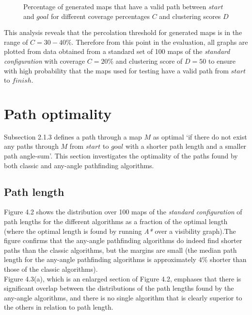 \documentclass[12pt,notitlepage]{report}
\begin{document}
\begin{figure}
\centering

\caption[Percentage of generated maps that have a valid path between $start$ and $goal$]{Percentage of generated maps that have a valid path between $start$ and $goal$ for different coverage percentages $C$ and clustering scores $D$}
\end{figure}

\noindent
This analysis reveals that the percolation threshold for generated maps is in the range of $C=30-40\%$. Therefore from this point in the evaluation, all graphs are plotted from data obtained from a standard set of 100 maps of the {\em standard configuration} with coverage $C=20\%$ and clustering score of $D=50$ to ensure with high probability that the maps used for testing have a valid path from $start$ to $finish$.

\section{Path optimality}

Subsection 2.1.3 defines a path through a map $M$ as optimal `if there do not exist any paths through $M$ from $start$ to $goal$ with a shorter path length and a smaller path angle-sum'. This section investigates the optimality of the paths found by both classic and any-angle pathfinding algorithms.\\

\subsection{Path length}
Figure 4.2 shows the distribution over 100 maps of the {\em standard configuration} of path lengths for the different algorithms  as a fraction of the optimal length (where the optimal length is found by running {\em A*} over a visibility graph).The figure confirms that the any-angle pathfinding algorithms do indeed find shorter paths than the classic algorithms, but the margins are small (the median path length for the any-angle pathfinding algorithms is approximately $4\%$ shorter than those of the classic algorithms).\\

\noindent
Figure 4.3(a), which is an enlarged section of Figure 4.2, emphases that there is significant overlap between the distributions of the path lengths found by the any-angle algorithms, and there is no single algorithm that is clearly superior to the others in relation to path length.\\
\end{document}

